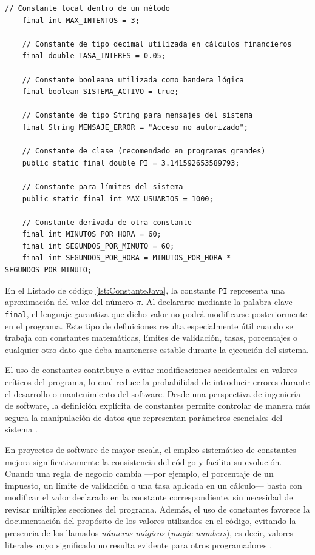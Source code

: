\documentclass[12pt,twoside]{book}
\begin{document}
						\begin{lstlisting}[style=Java,caption={Ejemplos de declaración de constantes en Java.},label={lst:ConstantesJavaEjemplos}]
	// Constante local dentro de un método
	final int MAX_INTENTOS = 3;
	
	// Constante de tipo decimal utilizada en cálculos financieros
	final double TASA_INTERES = 0.05;
	
	// Constante booleana utilizada como bandera lógica
	final boolean SISTEMA_ACTIVO = true;
	
	// Constante de tipo String para mensajes del sistema
	final String MENSAJE_ERROR = "Acceso no autorizado";
	
	// Constante de clase (recomendado en programas grandes)
	public static final double PI = 3.141592653589793;
	
	// Constante para límites del sistema
	public static final int MAX_USUARIOS = 1000;
								
	// Constante derivada de otra constante
	final int MINUTOS_POR_HORA = 60;
	final int SEGUNDOS_POR_MINUTO = 60;
	final int SEGUNDOS_POR_HORA = MINUTOS_POR_HORA * SEGUNDOS_POR_MINUTO; \end{lstlisting}						
	
						\noindent
						En el Listado de código \ref{lst:ConstanteJava}, la constante \texttt{PI} representa una aproximación del valor del número $\pi$. Al declararse mediante la palabra clave \texttt{final}, el lenguaje garantiza que dicho valor no podrá modificarse posteriormente en el programa. Este tipo de definiciones resulta especialmente útil cuando se trabaja con constantes matemáticas, límites de validación, tasas, porcentajes o cualquier otro dato que deba mantenerse estable durante la ejecución del sistema.
						
						El uso de constantes contribuye a evitar modificaciones accidentales en valores críticos del programa, lo cual reduce la probabilidad de introducir errores durante el desarrollo o mantenimiento del software. Desde una perspectiva de ingeniería de software, la definición explícita de constantes permite controlar de manera más segura la manipulación de datos que representan parámetros esenciales del sistema \cite{Pressman2019Software,Sommerville2015Software}.
						
						En proyectos de software de mayor escala, el empleo sistemático de constantes mejora significativamente la consistencia del código y facilita su evolución. Cuando una regla de negocio cambia —por ejemplo, el porcentaje de un impuesto, un límite de validación o una tasa aplicada en un cálculo— basta con modificar el valor declarado en la constante correspondiente, sin necesidad de revisar múltiples secciones del programa. Además, el uso de constantes favorece la documentación del propósito de los valores utilizados en el código, evitando la presencia de los llamados \textit{números mágicos} (\textit{magic numbers}), es decir, valores literales cuyo significado no resulta evidente para otros programadores \cite{McConnell2004Code}.
						
\end{document}
